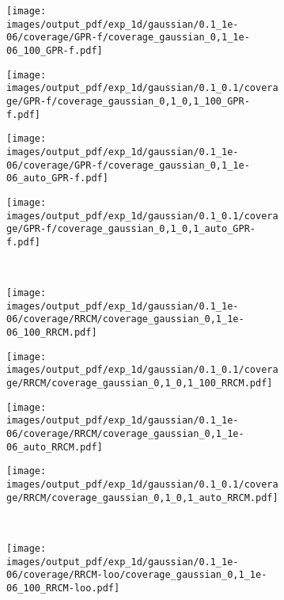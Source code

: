 \documentclass[a4paper,14pt]{extarticle}
\begin{document}
\begin{figure}%
  \centering
  \begin{subfigure}[b]{0.25\linewidth}
    \texttt{[image: images/output\_pdf/exp\_1d/gaussian/0.1\_1e-06/coverage/GPR-f/coverage\_gaussian\_0,1\_1e-06\_100\_GPR-f.pdf]}
  \end{subfigure}%
  \begin{subfigure}[b]{0.25\linewidth}
    \texttt{[image: images/output\_pdf/exp\_1d/gaussian/0.1\_0.1/coverage/GPR-f/coverage\_gaussian\_0,1\_0,1\_100\_GPR-f.pdf]}
  \end{subfigure}%
  \begin{subfigure}[b]{0.25\linewidth}
    \texttt{[image: images/output\_pdf/exp\_1d/gaussian/0.1\_1e-06/coverage/GPR-f/coverage\_gaussian\_0,1\_1e-06\_auto\_GPR-f.pdf]}
  \end{subfigure}%
  \begin{subfigure}[b]{0.25\linewidth}
    \texttt{[image: images/output\_pdf/exp\_1d/gaussian/0.1\_0.1/coverage/GPR-f/coverage\_gaussian\_0,1\_0,1\_auto\_GPR-f.pdf]}
  \end{subfigure}\\
  \begin{subfigure}[b]{0.25\linewidth}
    \texttt{[image: images/output\_pdf/exp\_1d/gaussian/0.1\_1e-06/coverage/RRCM/coverage\_gaussian\_0,1\_1e-06\_100\_RRCM.pdf]}
  \end{subfigure}%
  \begin{subfigure}[b]{0.25\linewidth}
    \texttt{[image: images/output\_pdf/exp\_1d/gaussian/0.1\_0.1/coverage/RRCM/coverage\_gaussian\_0,1\_0,1\_100\_RRCM.pdf]}
  \end{subfigure}%
  \begin{subfigure}[b]{0.25\linewidth}
    \texttt{[image: images/output\_pdf/exp\_1d/gaussian/0.1\_1e-06/coverage/RRCM/coverage\_gaussian\_0,1\_1e-06\_auto\_RRCM.pdf]}
  \end{subfigure}%
  \begin{subfigure}[b]{0.25\linewidth}
    \texttt{[image: images/output\_pdf/exp\_1d/gaussian/0.1\_0.1/coverage/RRCM/coverage\_gaussian\_0,1\_0,1\_auto\_RRCM.pdf]}
  \end{subfigure}\\
  \begin{subfigure}[b]{0.25\linewidth}
    \texttt{[image: images/output\_pdf/exp\_1d/gaussian/0.1\_1e-06/coverage/RRCM-loo/coverage\_gaussian\_0,1\_1e-06\_100\_RRCM-loo.pdf]}

\end{subfigure}
\end{figure}
\end{document}
